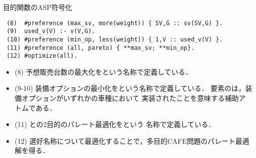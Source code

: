 \documentclass[dvipdfmx, 11pt]{beamer}
\begin{document}

\begin{frame}[fragile]{目的関数のASP符号化}
\begin{exampleblock}{}\small
\begin{lstlisting}
 (8)  #preference (max_sv, more(weight)) { SV,G :: sv(SV,G) }.
 (9)  used_v(V) :- v(V,G).
 (10) #preference (min_op, less(weight)) { 1,V :: used_v(V) }.
 (11) #preference (all, pareto) { **max_sv; **min_op}.
 (12) #optimize(all). 
\end{lstlisting}
\end{exampleblock}
\begin{itemize}
 \item (8) 予想販売台数の最大化をという名称で定義している．
 \item (9-10) 装備オプションの最小化をという名称で定義している．
       要素のは，装備オプションがいずれかの車種において
       実装されたことを意味する補助アトムである．
 \item (11) との2目的のパレート最適化をという
       名称で定義している．
 \item (12) 選好名称について最適化することで，多目的CAFE問題のパレート最適解を得る．
\end{itemize}
\end{frame}
\end{document}
